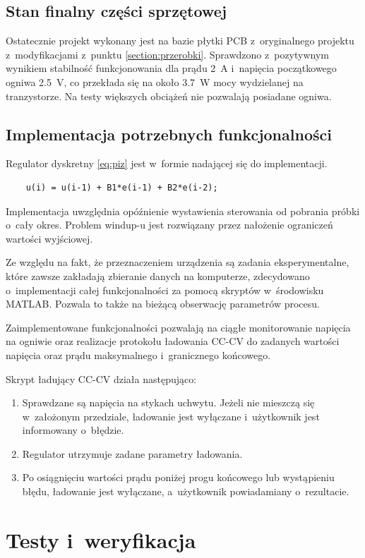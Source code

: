 \documentclass[polish,engineer]{polsl-msth}
\begin{document}
\section{Stan finalny części sprzętowej}
Ostatecznie projekt wykonany jest na bazie płytki PCB z~oryginalnego projektu z~modyfikacjami z~punktu \ref{section:przerobki}. Sprawdzono z~pozytywnym wynikiem stabilność funkcjonowania dla prądu 2~A i~napięcia początkowego ogniwa 2.5~V, co przekłada się na około 3.7~W mocy wydzielanej na tranzystorze. Na testy większych obciążeń nie pozwalają posiadane ogniwa.

\section{Implementacja potrzebnych funkcjonalności}
Regulator dyskretny \ref{eq:piz} jest w~formie nadającej się do implementacji.
\begin{verbatim}
    u(i) = u(i-1) + B1*e(i-1) + B2*e(i-2);
\end{verbatim}
Implementacja uwzględnia opóźnienie wystawienia sterowania od pobrania próbki o~cały okres.
Problem windup-u jest rozwiązany przez nałożenie ograniczeń wartości wyjściowej.

Ze względu na fakt, że przeznaczeniem urządzenia są zadania eksperymentalne, które zawsze zakładają zbieranie danych na komputerze, zdecydowano o~implementacji całej funkcjonalności za pomocą skryptów w~środowisku MATLAB. Pozwala to także na bieżącą obserwację parametrów procesu.

Zaimplementowane funkcjonalności pozwalają na ciągłe monitorowanie napięcia na ogniwie oraz realizacje protokołu ładowania CC-CV do zadanych wartości napięcia oraz prądu maksymalnego i~granicznego końcowego.

Skrypt ładujący CC-CV działa następująco:
\begin{enumerate}
    \item Sprawdzane są napięcia na stykach uchwytu. Jeżeli nie mieszczą się w~założonym przedziale, ładowanie jest wyłączane i~użytkownik jest informowany o~błędzie.
    \item Regulator utrzymuje zadane parametry ładowania.
    \item Po osiągnięciu wartości prądu poniżej progu końcowego lub wystąpieniu błędu, ładowanie jest wyłączane, a~użytkownik powiadamiany o~rezultacie.
\end{enumerate}


\chapter{Testy i~weryfikacja}
\end{document}
